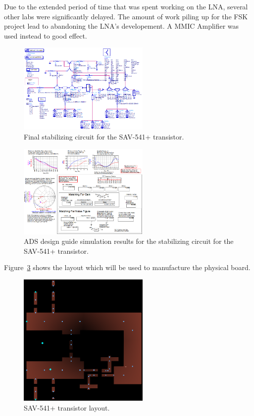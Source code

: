 \documentclass[conference]{IEEEtran}
\begin{document}
Due to the extended period of time that was spent working on the LNA, several other labs were significantly delayed. The amount of work piling up for the FSK project lead to abandoning the LNA's developement. A MMIC Amplifier was used instead to good effect. 

\begin{figure}[!h]
\centering
\includegraphics[width=2.5in]{pics/FinalStabilizingCircuit.png}
\caption{Final stabilizing circuit for the SAV-541+ transistor.}
\label{fig:finalstabcircuit}
\end{figure}

\begin{figure}[!h]
\centering
\includegraphics[width=2.5in]{pics/FinalStabilizingSimulation.png}
\caption{ADS design guide simulation results for the stabilizing circuit for the SAV-541+ transistor.}
\label{fig:finalstabsimulation}
\end{figure}

Figure~\ref{fig:lnaLayout} shows the layout which will be used to manufacture the physical board.
\begin{figure}[!h]
\centering
\includegraphics[width=2.5in]{LNApics/LNAlayout.png}
\caption{SAV-541+ transistor layout.}
\label{fig:lnaLayout}
\end{figure}
\end{document}
